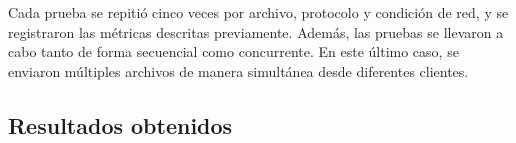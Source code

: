 Cada prueba se repitió cinco veces por archivo, protocolo y condición de red, y se registraron las métricas descritas previamente. Además, las pruebas se llevaron a cabo tanto de forma secuencial como concurrente. En este último caso, se enviaron múltiples archivos de manera simultánea desde diferentes clientes.


\subsection{Resultados obtenidos}
